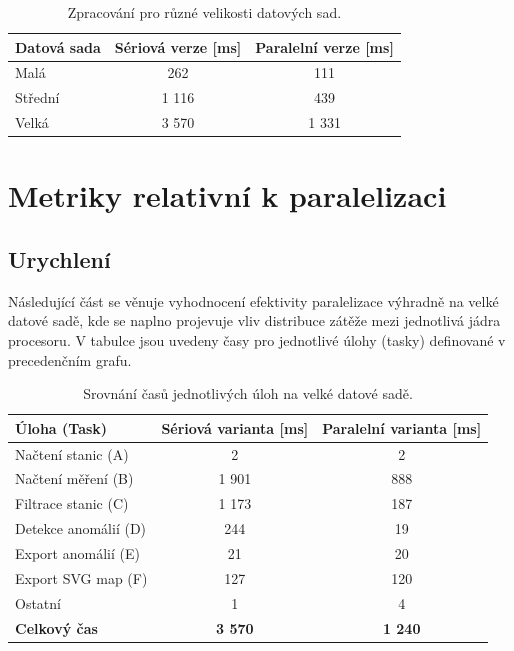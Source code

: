 \documentclass[10pt, a4paper]{report}
\begin{document}
	\begin{table}[h]
		\centering
		\renewcommand{\arraystretch}{1.2}
		\begin{tabular}{|l|c|c|}
			\hline
			\textbf{Datová sada} & \textbf{Sériová verze [ms]} & \textbf{Paralelní verze [ms]} \\ \hline
			Malá & 262 & 111 \\ \hline
			Střední & 1 116 & 439 \\ \hline
			Velká & 3 570 & 1 331 \\ \hline
		\end{tabular}
		\caption{Zpracování pro různé velikosti datových sad.}
		\label{tab:mereni_vykonu}
	\end{table}
	
	\chapter{Metriky relativní k paralelizaci}
	
	\section{Urychlení}
	
	Následující část se věnuje vyhodnocení efektivity paralelizace výhradně na velké datové sadě, kde se naplno projevuje vliv distribuce zátěže mezi jednotlivá jádra procesoru. V tabulce jsou uvedeny časy pro jednotlivé úlohy (tasky) definované v precedenčním grafu.
	
	\begin{table}[H]
		\centering
		\renewcommand{\arraystretch}{1.2}
		\begin{tabular}{|l|c|c|}
			\hline
			\textbf{Úloha (Task)} & \textbf{Sériová varianta [ms]} & \textbf{Paralelní varianta [ms]} \\ \hline
			Načtení stanic (A) & 2 & 2 \\ \hline
			Načtení měření (B) & 1 901 & 888 \\ \hline
			Filtrace stanic (C) & 1 173 & 187 \\ \hline
			Detekce anomálií (D) & 244 & 19 \\ \hline
			Export anomálií (E) & 21 & 20 \\ \hline
			Export SVG map (F) & 127 & 120 \\ \hline
			Ostatní & 1 & 4 \\ \hline
			\hline
			\textbf{Celkový čas} & \textbf{3 570} & \textbf{1 240} \\ \hline
		\end{tabular}
		\caption{Srovnání časů jednotlivých úloh na velké datové sadě.}
		\label{tab:velka_data_detaily}
	\end{table}
	
\end{document}
